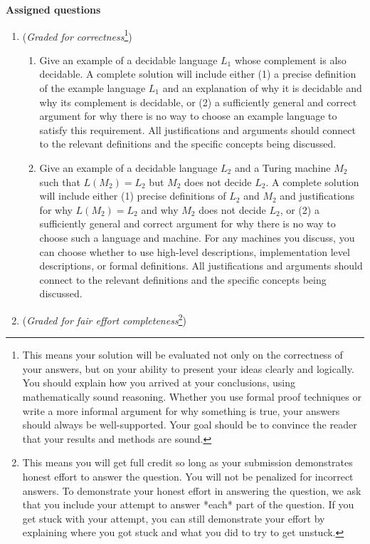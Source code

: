 \documentclass[12pt, oneside]{article}
\begin{document}
\newpage
{\bf Assigned questions}
\begin{enumerate}
    \item ({\it Graded for correctness}\footnote{This means your solution will be
    evaluated not only on the correctness of your answers, but on your ability to 
    present your ideas clearly and logically. You should explain how you arrived at 
    your conclusions, using  mathematically sound reasoning. Whether you use formal proof techniques or 
    write a more informal argument for why 
    something is true, your answers should always be well-supported. Your goal 
    should be to convince the reader that 
    your results and methods are sound.}) 
    \begin{enumerate}
        \item Give an example of a decidable language $L_1$ whose complement is also decidable.
        A complete solution will include either (1) a precise definition of the example language $L_1$ and 
        an explanation of why it is decidable and why its complement is decidable, or 
        (2) a sufficiently general and correct argument for why there is no way to choose 
        an example language to satisfy this requirement. All justifications and arguments should
        connect to the relevant definitions and the specific concepts being discussed.
        \item Give an example of a decidable language $L_2$ and a Turing machine $M_2$ such that
        $L(M_2) = L_2$ but $M_2$ does not decide $L_2$.  A complete solution will include either (1) precise
        definitions of $L_2$ and $M_2$ and justifications for why $L(M_2) = L_2$ and why $M_2$
        does not decide $L_2$, or (2) a sufficiently general and correct argument for why there is no way to choose 
        such a language and machine. For any machines you discuss, you can choose whether to use high-level descriptions,
        implementation level descriptions, or formal definitions. All justifications and arguments should
        connect to the relevant definitions and the specific concepts being discussed.
    \end{enumerate}
    \item ({\it Graded for fair effort completeness}\footnote{This means 
    you will get full credit so long as your submission demonstrates honest 
    effort to answer the question. You will not be penalized for incorrect answers. 
    To demonstrate your honest effort in answering the question, we ask that you 
    include your attempt to answer *each* part of the question. If you get stuck 
    with your attempt, you can still demonstrate your effort by explaining where 
    you got stuck and what you did to try to get unstuck.})


\end{enumerate}
\end{document}
